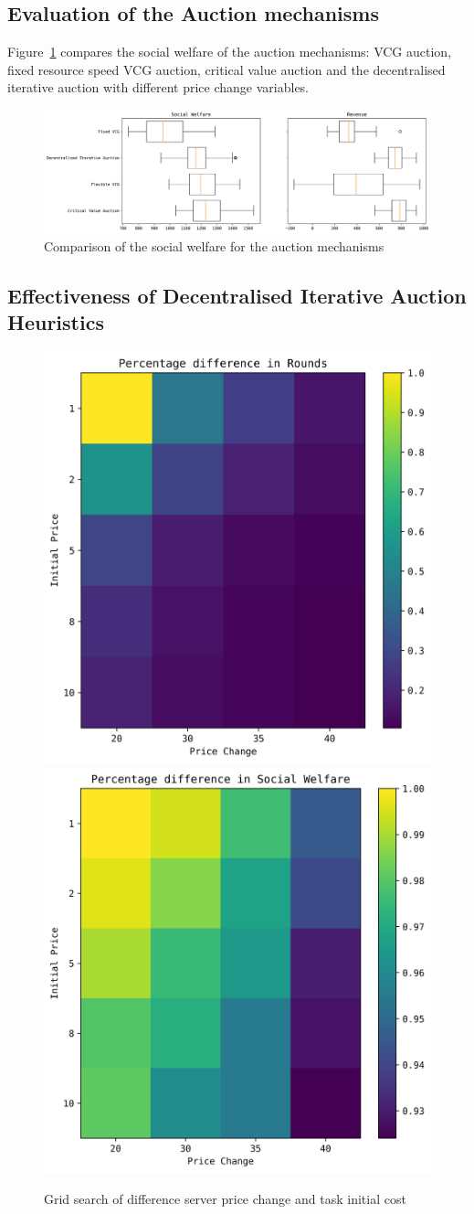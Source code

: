 \subsection{Evaluation of the Auction mechanisms}\label{subsec:evaluation-of-the-auction-mechanisms}
Figure~\ref{fig:auction-mechanisms-comparison} compares the social welfare of the auction mechanisms: VCG auction,
fixed resource speed VCG auction, critical value auction and the decentralised iterative auction with different price
change variables.

\begin{figure}
    \centering
    \includegraphics[width=\linewidth]{figs/auctions/auctions_results.png}
    \caption{Comparison of the social welfare for the auction mechanisms}
    \label{fig:auction-mechanisms-comparison}
\end{figure}

\subsection{Effectiveness of Decentralised Iterative Auction Heuristics}
\label{subsec:effectiveness-of-decentralised-iterative-auction-heuristics}
\begin{figure}
    \centering
    \includegraphics[width=0.45\linewidth]{figs/dia_heuristics/rounds_grid.png}
    \includegraphics[width=0.45\linewidth]{figs/dia_heuristics/social_welfare_grid.png}
    \caption{Grid search of difference server price change and task initial cost}
    \label{fig:dia_sw_rev_grid_search}
\end{figure}

